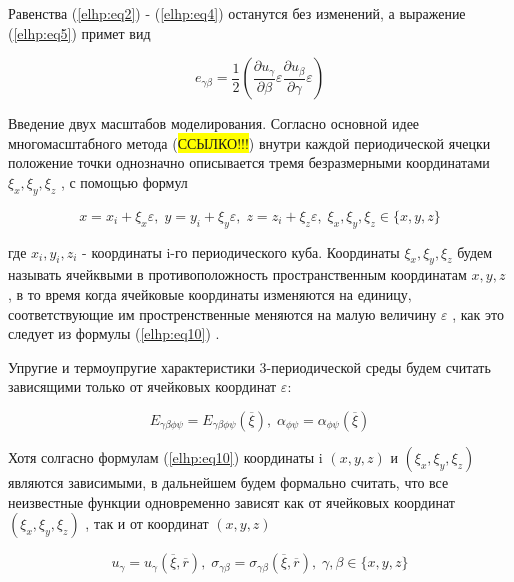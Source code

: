 Равенства 
(\ref{elhp:eq2})
-
(\ref{elhp:eq4})
останутся без изменений, а выражение 
(\ref{elhp:eq5})
примет вид

\begin{equation}
    \label{elhp:eq9}
    e_{\gamma\beta} = \frac{1}{2}
    \left( \frac{\partial u_{\gamma}}{\partial \beta} \varepsilon \frac{\partial u_{\beta}}{\partial \gamma} \varepsilon \right) 
\end{equation}

Введение двух масштабов моделирования. Согласно основной идее многомасштабного метода (\colorbox{yellow}{ССЫЛКО!!!}) внутри каждой периодической ячецки положение
точки однозначно описывается тремя безразмерными координатами 
$\xi_x, \xi_y, \xi_z$
, с помощью формул

\begin{equation}
    \label{elhp:eq10}
    x = x_i + \xi_x \varepsilon ,\;
    y = y_i + \xi_y \varepsilon ,\;
    z = z_i + \xi_z \varepsilon ,\;
    \xi_x,\xi_y,\xi_z \in \{x,y,z\} 
\end{equation}

где
$x_i, y_i, z_i$ 
- координаты i-го периодического куба. Координаты  
$\xi_x, \xi_y, \xi_z$ 
будем называть ячейквыми в противоположность пространственным 
координатам 
$x,y,z$
, в то время когда ячейковые координаты изменяются на единицу, соответствующие им простренственные меняются на малую величину 
$\varepsilon$
, как это следует из формулы 
(\ref{elhp:eq10})
.

Упругие и термоупругие характеристики 3-периодической среды будем считать зависящими только от ячейковых координат 
$\varepsilon$:

\begin{equation}
    \label{elhp:eq11}
    E_{\gamma\beta\phi\psi} = 
    E_{\gamma\beta\phi\psi} 
    \left( \overline{\xi} \right) 
    ,\;
    \alpha_{\phi\psi} = 
    \alpha_{\phi\psi}
    \left( \overline{\xi} \right) 
\end{equation}

Хотя солгасно формулам 
(\ref{elhp:eq10})
координаты i
$ \left( x,y,z \right) $ 
и 
$ \left( \xi_x, \xi_y, \xi_z \right) $ 
являются зависимыми, в дальнейшем
будем формально считать, что все неизвестные функции
одновременно зависят как от ячейковых координат 
$ \left( \xi_x, \xi_y, \xi_z \right) $
, так и от координат 
$ \left( x,y,z \right) $

\begin{equation}
    \label{elhp:eq13}
    u_{\gamma} =
    u_{\gamma}
    \left( \overline{\xi}, \overline{r} \right) 
    ,\;
    \sigma_{\gamma\beta} = 
    \sigma_{\gamma\beta}
    \left( \overline{\xi}, \overline{r} \right) 
    ,\;
    \gamma,\beta \in \{x,y,z\} 
\end{equation}


